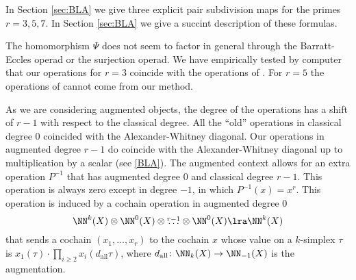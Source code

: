 In Section \ref{sec:BLA} we give three explicit pair subdivision maps for the primes $r=3,5,7$. In Section \ref{sec:BLA} we give a succint description of these formulas. 

The homomorphism $\Psi$ does not seem to factor in general through the Barratt-Eccles operad or the surjection operad. We have empirically tested by computer that our operations for $r=3$ coincide with the operations of \cite{Anibaletal}. For $r=5$ the operations of \cite{Anibaletal} cannot come from our method. 


As we are considering augmented objects, the degree of the operations has a shift of $r-1$ with respect to the classical degree. All the ``old'' operations in classical degree $0$ coincided with the Alexander-Whitney diagonal. Our operations in augmented degree $r-1$ do coincide with the Alexander-Whitney diagonal up to multiplication by a scalar (see \ref{BLA}). The augmented context allows for an extra operation $P^{-1}$ that has augmented degree $0$ and classical degree $r-1$. This operation is always zero except in degree $-1$, in which $P^{-1}(x) = x^r$. This operation is induced by a cochain operation in augmented degree $0$
\[\NN^{k}(X)\otimes \NN^{0}(X)\otimes\overset{r-1}{\ldots}\otimes \NN^{0}(X)\lra \NN^{k}(X)\]
that sends a cochain $(x_1,\ldots,x_r)$ to the cochain $x$ whose value on a $k$-simplex $\tau$ is $x_1(\tau)\cdot \prod_{i\geq 2} x_i(d_{\mathrm{all}}\tau)$, where $d_{\mathrm{all}}\colon \NN_k(X)\to \NN_{-1}(X)$ is the augmentation. 



